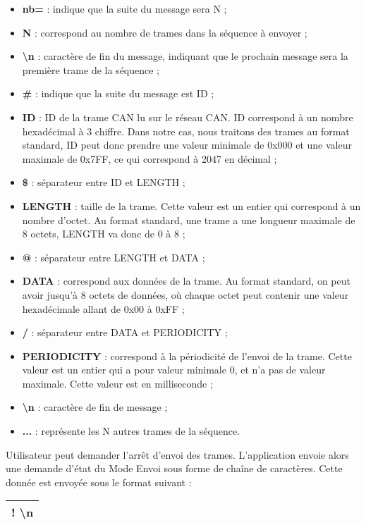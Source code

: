\begin{itemize}
    \item \textbf{nb=} : indique que la suite du message sera N ;
    \item \textbf{N} : correspond au nombre de trames dans la séquence à envoyer ;
    \item \textbf{\textbackslash n} : caractère de fin du message, indiquant que le prochain message sera la première trame de la séquence ;
    \item \textbf{\#} : indique que la suite du message est ID ;
    \item \textbf{ID} : ID de la trame CAN lu sur le réseau CAN. ID correspond à un nombre hexadécimal à 3 chiffre. Dans notre cas, nous traitons des trames au format standard, ID peut donc prendre une valeur minimale de 0x000 et une valeur maximale de 0x7FF, ce qui correspond à 2047 en décimal ;
    \item \textbf{\$} : séparateur entre ID et LENGTH ;
    \item \textbf{LENGTH} : taille de la trame. Cette valeur est un entier qui correspond à un nombre d'octet. Au format standard, une trame a une longueur maximale de 8 octets, LENGTH va donc de 0 à 8 ;
    \item \textbf{@} : séparateur entre LENGTH et DATA ;
    \item \textbf{DATA} : correspond aux données de la trame. Au format standard, on peut avoir jusqu'à 8 octets de données, où chaque octet peut contenir une valeur hexadécimale allant de 0x00 à 0xFF ;
    \item \textbf{/} : séparateur entre DATA et PERIODICITY ;
    \item \textbf{PERIODICITY} : correspond à la périodicité de l'envoi de la trame. Cette valeur est un entier qui a pour valeur minimale 0, et n'a pas de valeur maximale. Cette valeur est en milliseconde ;
    \item \textbf{\textbackslash n} : caractère de fin de message ;
    \item \textbf{...} : représente les N autres trames de la séquence.\\
\end{itemize}

Utilisateur peut demander l'arrêt d'envoi des trames. L'application {\nomApplication} envoie alors une demande d'état du Mode Envoi sous forme de chaîne de caractères. Cette donnée est envoyée sous le format suivant : \\

\begin{minipage}
    \textwidth
    \centering
    \begin{tabular}{|c|}
        \hline
        ! \textbackslash n\\
        \hline
    \end{tabular}
\end{minipage}

